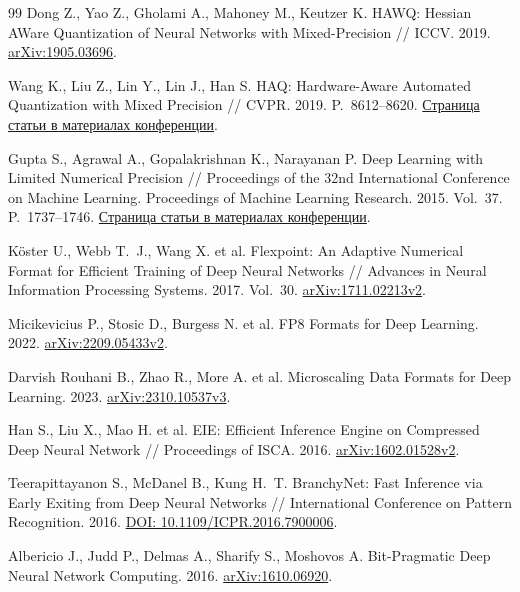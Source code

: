 \begin{thebibliography}{99}
Dong Z., Yao Z., Gholami A., Mahoney M., Keutzer K.
HAWQ: Hessian AWare Quantization of Neural Networks with Mixed-Precision //
ICCV. 2019.
\href{https://arxiv.org/abs/1905.03696}{arXiv:1905.03696}.

Wang K., Liu Z., Lin Y., Lin J., Han S.
HAQ: Hardware-Aware Automated Quantization with Mixed Precision //
CVPR. 2019. P.~8612--8620.
\href{https://openaccess.thecvf.com/content_CVPR_2019/html/Wang_HAQ_Hardware-Aware_Automated_Quantization_With_Mixed_Precision_CVPR_2019_paper.html}{Страница статьи в материалах конференции}.

Gupta S., Agrawal A., Gopalakrishnan K., Narayanan P.
Deep Learning with Limited Numerical Precision //
Proceedings of the 32nd International Conference on Machine Learning.
Proceedings of Machine Learning Research. 2015. Vol.~37. P.~1737--1746.
\href{https://proceedings.mlr.press/v37/gupta15.html}{Страница статьи в материалах конференции}.

Köster U., Webb T.~J., Wang X. et al.
Flexpoint: An Adaptive Numerical Format for Efficient Training of Deep
Neural Networks // Advances in Neural Information Processing Systems.
2017. Vol.~30.
\href{https://arxiv.org/abs/1711.02213v2}{arXiv:1711.02213v2}.

Micikevicius P., Stosic D., Burgess N. et al.
FP8 Formats for Deep Learning. 2022.
\href{https://arxiv.org/abs/2209.05433v2}{arXiv:2209.05433v2}.

Darvish Rouhani B., Zhao R., More A. et al.
Microscaling Data Formats for Deep Learning. 2023.
\href{https://arxiv.org/abs/2310.10537v3}{arXiv:2310.10537v3}.

Han S., Liu X., Mao H. et al.
EIE: Efficient Inference Engine on Compressed Deep Neural Network //
Proceedings of ISCA. 2016.
\href{https://arxiv.org/abs/1602.01528v2}{arXiv:1602.01528v2}.

Teerapittayanon S., McDanel B., Kung H.~T.
BranchyNet: Fast Inference via Early Exiting from Deep Neural Networks //
International Conference on Pattern Recognition. 2016.
\href{https://doi.org/10.1109/ICPR.2016.7900006}{DOI: 10.1109/ICPR.2016.7900006}.

Albericio J., Judd P., Delmas A., Sharify S., Moshovos A.
Bit-Pragmatic Deep Neural Network Computing. 2016.
\href{https://arxiv.org/abs/1610.06920}{arXiv:1610.06920}.


\end{thebibliography}
